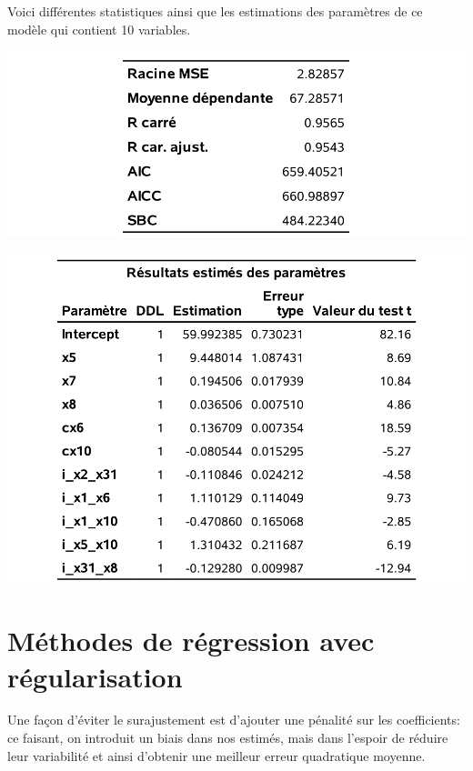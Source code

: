 \documentclass[
  11pt,
  letterpaper,
]{book}
\theoremstyle{definition}
\theoremstyle{definition}
\theoremstyle{definition}
\theoremstyle{remark}
\begin{document}
Voici différentes statistiques ainsi que les estimations des paramètres de ce modèle qui contient 10 variables.

\begin{center}\includegraphics[width=0.65\linewidth]{figures/02-select-e14} \end{center}

\begin{center}\includegraphics[width=0.7\linewidth]{figures/02-select-e15} \end{center}

\hypertarget{muxe9thodes-de-ruxe9gression-avec-ruxe9gularisation}{%
\section{Méthodes de régression avec régularisation}\label{muxe9thodes-de-ruxe9gression-avec-ruxe9gularisation}}

Une façon d'éviter le surajustement est d'ajouter une pénalité sur les coefficients: ce faisant, on introduit un biais dans nos estimés, mais dans l'espoir de réduire leur variabilité et ainsi d'obtenir une meilleur erreur quadratique moyenne.
\end{document}
